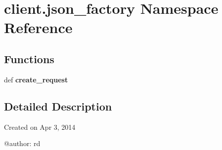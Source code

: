 \hypertarget{namespaceclient_1_1json__factory}{\section{client.\-json\-\_\-factory Namespace Reference}
\label{namespaceclient_1_1json__factory}
}
\subsection*{Functions}
\begin{DoxyCompactItemize}
\item 
\hypertarget{namespaceclient_1_1json__factory_ae0a0f99307727601072adb0ef141fd2a}{def {\bfseries create\-\_\-request}}\label{namespaceclient_1_1json__factory_ae0a0f99307727601072adb0ef141fd2a}

\end{DoxyCompactItemize}


\subsection{Detailed Description}
\begin{DoxyVerb}Created on Apr 3, 2014

@author: rd
\end{DoxyVerb}
 